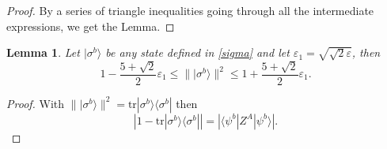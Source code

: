 \documentclass[onecolumn,prx,amsmath,amssymb]{revtex4-2}
\newtheorem{lem}{Lemma}
\def\be{\begin{equation}}
\def\ee{\end{equation}}
\def\bra#1{\langle#1|} \def\ket#1{|#1\rangle}
\def\proj#1{\ket{#1}\!\bra{#1}}
\def\id{{\mathbb I}}
\def\tr{\mbox{tr}}
\def\norm#1{\| #1 \| }
\def\abs#1{|#1|}
\begin{document}
\begin{appendix}
\begin{proof}
By a series of triangle inequalities going through all the intermediate expressions, we get the Lemma.
\end{proof}

\begin{lem} \label{lem2} Let $\ket{\sigma^b}$ be any state defined in \eqref{sigma} and let $\varepsilon_1=\sqrt{\sqrt{2}\varepsilon}$, then
\begin{equation}\label{eq:lem2}
1-\frac{5+\sqrt{2}}{2}\varepsilon_1 \leq \norm{\ket{\sigma^b}}^2 \leq 1 + \frac{5+\sqrt{2}}{2}\varepsilon_1.
\end{equation}
\end{lem}

\begin{proof}
With $\norm{\ket{\sigma^b}}^2 = \tr{\proj{\sigma^b}}$ then
\be\label{eq:lem2b}
\abs{1-\tr{\proj{\sigma^b}}} = \abs{\bra{\psi^b} Z^A \ket{\psi^b}}.
\ee


\end{proof}
\end{appendix}
\end{document}
